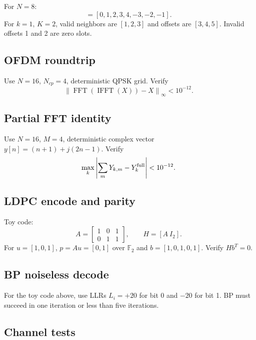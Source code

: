 \documentclass[11pt]{article}
\newcommand{\F}{\mathbb{F}}
\newcommand{\norm}[1]{\left\lVert #1 \right\rVert}
\begin{document}
For $N=8$:
\begin{equation}
[\kappa(1),\ldots,\kappa(8)]=[0,1,2,3,4,-3,-2,-1].
\end{equation}
For $k=1$, $K=2$, valid neighbors are $[1,2,3]$ and offsets are $[3,4,5]$. Invalid offsets 1 and 2 are zero slots.

\subsection{OFDM roundtrip}

Use $N=16$, $N_{cp}=4$, deterministic QPSK grid. Verify
\begin{equation}
\norm{\operatorname{FFT}(\operatorname{IFFT}(X))-X}_\infty<10^{-12}.
\end{equation}

\subsection{Partial FFT identity}

Use $N=16$, $M=4$, deterministic complex vector $y[n]=(n+1)+j(2n-1)$. Verify
\begin{equation}
\max_k\left|\sum_mY_{k,m}-Y_k^{\rm full}\right|<10^{-12}.
\end{equation}

\subsection{LDPC encode and parity}

Toy code:
\begin{equation}
A=\begin{bmatrix}1&0&1\\0&1&1\end{bmatrix},\qquad H=[A\ I_2].
\end{equation}
For $u=[1,0,1]$, $p=A u=[0,1]$ over $\F_2$ and $b=[1,0,1,0,1]$. Verify $Hb^T=0$.

\subsection{BP noiseless decode}

For the toy code above, use LLRs $L_i=+20$ for bit 0 and $-20$ for bit 1. BP must succeed in one iteration or less than five iterations.

\subsection{Channel tests}
\end{document}
